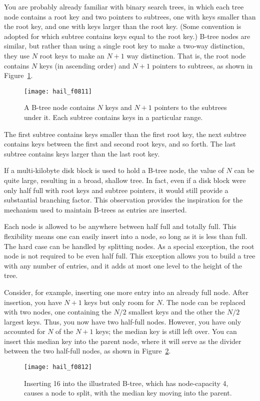 You are probably already familiar with binary search trees, in which
each tree node contains a root key and two pointers to subtrees, one
with keys smaller than the root key, and one with keys larger than the
root key.  (Some convention is adopted for which subtree contains keys
equal to the root key.)  B-tree nodes are similar, but rather than
using a single root key to make a two-way distinction, they use $N$
root keys to make an $N+1$ way distinction.  That is, the root node
contains $N$ keys (in ascending order) and $N+1$ pointers to subtrees,
as shown in Figure~\ref{scan-8-1}.
\begin{figure}
\centerline{\texttt{[image: hail\_f0811]}}
\caption{A B-tree node contains $N$ keys and $N+1$ pointers to the
subtrees under it.  Each subtree contains keys in a particular range.}
\label{scan-8-1}
\end{figure}
The first subtree contains keys smaller than the first root key, the
next subtree contains keys between the first and second root keys,
and so forth.  The last subtree contains keys larger than the last root key.

If a multi-kilobyte disk block is used to hold a B-tree node, the
value of $N$ can be quite large, resulting in a broad, shallow tree.
In fact, even if a disk block were only half full with root keys and
subtree pointers, it would still provide a substantial branching
factor.  This observation provides the inspiration for the mechanism
used to maintain B-trees as entries are inserted.

Each node is allowed to be anywhere between half full and totally
full.
This flexibility means one can easily insert into a node, so long as
it is less than full.
The hard case can be handled by
splitting nodes.  As a special exception, the root node is not
required to be even half full.  This exception allows you to build a
tree with any number of entries, and it adds at most one level to the height
of the tree.

Consider, for example, inserting one more entry into an already full
node.  After insertion, you have $N+1$ keys but only room for $N$.  The node
can be replaced with two nodes, one containing the $N/2$ smallest keys
and the other the $N/2$ largest keys.  Thus, you now have two half-full
nodes.  However, you have only accounted for $N$ of the $N+1$ keys; the
median key is still left over.  You can insert this median key into the
parent node, where it will serve as the divider between the two
half-full nodes, as shown in Figure~\ref{B-tree-split}.
\begin{figure}
\centerline{\texttt{[image: hail\_f0812]}}
\caption{Inserting 16 into the illustrated B-tree, which has
node-capacity 4, causes a node to split, with the median key moving
into the parent.}
\label{B-tree-split}
\end{figure}

